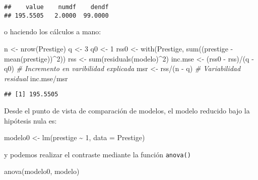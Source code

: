 \documentclass[
]{book}
\newenvironment{Shaded}{\begin{snugshade}}{\end{snugshade}}
\newcommand{\AttributeTok}[1]{\textcolor[rgb]{0.77,0.63,0.00}{#1}}
\newcommand{\CommentTok}[1]{\textcolor[rgb]{0.56,0.35,0.01}{\textit{#1}}}
\newcommand{\DecValTok}[1]{\textcolor[rgb]{0.00,0.00,0.81}{#1}}
\newcommand{\FunctionTok}[1]{\textcolor[rgb]{0.00,0.00,0.00}{#1}}
\newcommand{\NormalTok}[1]{#1}
\newcommand{\OtherTok}[1]{\textcolor[rgb]{0.56,0.35,0.01}{#1}}
\newcommand{\SpecialCharTok}[1]{\textcolor[rgb]{0.00,0.00,0.00}{#1}}
\theoremstyle{break}
\theoremstyle{definition}
\theoremstyle{definition}
\theoremstyle{definition}
\theoremstyle{definition}
\theoremstyle{remark}
\begin{document}
\begin{verbatim}
##    value    numdf    dendf 
## 195.5505   2.0000  99.0000
\end{verbatim}

o haciendo los cálculos a mano:

\begin{Shaded}
\begin{Highlighting}[]
\NormalTok{n }\OtherTok{\textless{}{-}} \FunctionTok{nrow}\NormalTok{(Prestige)}
\NormalTok{q }\OtherTok{\textless{}{-}} \DecValTok{3}
\NormalTok{q0 }\OtherTok{\textless{}{-}} \DecValTok{1}
\NormalTok{rss0 }\OtherTok{\textless{}{-}} \FunctionTok{with}\NormalTok{(Prestige, }\FunctionTok{sum}\NormalTok{((prestige }\SpecialCharTok{{-}} \FunctionTok{mean}\NormalTok{(prestige))}\SpecialCharTok{\^{}}\DecValTok{2}\NormalTok{))}
\NormalTok{rss }\OtherTok{\textless{}{-}} \FunctionTok{sum}\NormalTok{(}\FunctionTok{residuals}\NormalTok{(modelo)}\SpecialCharTok{\^{}}\DecValTok{2}\NormalTok{)}
\NormalTok{inc.mse }\OtherTok{\textless{}{-}}\NormalTok{ (rss0 }\SpecialCharTok{{-}}\NormalTok{ rss)}\SpecialCharTok{/}\NormalTok{(q }\SpecialCharTok{{-}}\NormalTok{ q0)  }\CommentTok{\# Incremento en varibilidad explicada}
\NormalTok{msr }\OtherTok{\textless{}{-}}\NormalTok{  rss}\SpecialCharTok{/}\NormalTok{(n }\SpecialCharTok{{-}}\NormalTok{ q)               }\CommentTok{\# Variabilidad residual}
\NormalTok{inc.mse}\SpecialCharTok{/}\NormalTok{msr}
\end{Highlighting}
\end{Shaded}

\begin{verbatim}
## [1] 195.5505
\end{verbatim}

Desde el punto de vista de comparación de modelos, el modelo
reducido bajo la hipótesis nula es:

\begin{Shaded}
\begin{Highlighting}[]
\NormalTok{modelo0 }\OtherTok{\textless{}{-}} \FunctionTok{lm}\NormalTok{(prestige }\SpecialCharTok{\textasciitilde{}} \DecValTok{1}\NormalTok{, }\AttributeTok{data =}\NormalTok{ Prestige)}
\end{Highlighting}
\end{Shaded}

y podemos realizar el contraste mediante la función \texttt{anova()}

\begin{Shaded}
\begin{Highlighting}[]
\FunctionTok{anova}\NormalTok{(modelo0, modelo)}
\end{Highlighting}
\end{Shaded}
\end{document}
